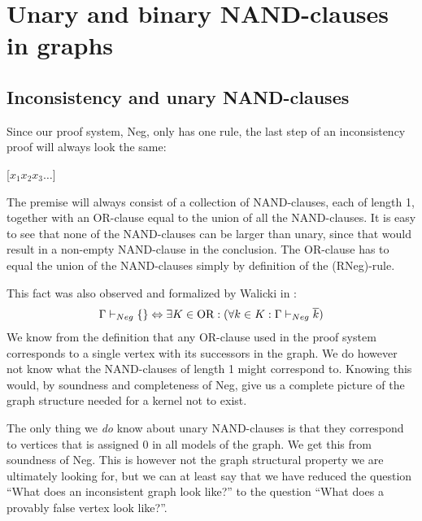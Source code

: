 \section{Unary and binary NAND-clauses in graphs}
\label{sec:Unary and binary NAND-clauses in graphs}
\subsection{Inconsistency and unary NAND-clauses}
\label{sub:Inconsistency and unary NAND-clauses}
Since our proof system, Neg, only has one rule, the last step of an inconsistency proof will always look the same:
\begin{prooftree*}
  \Hypo{\dots}
  [$x_1x_2x_3\dots$]{\varnothing}
\end{prooftree*}
The premise will always consist of a collection of NAND-clauses, each of length 1, together with an OR-clause equal to the union of all the NAND-clauses.
It is easy to see that none of the NAND-clauses can be larger than unary, since that would result in a non-empty NAND-clause in the conclusion.
The OR-clause has to equal the union of the NAND-clauses simply by definition of the (RNeg)-rule.

This fact was also observed and formalized by Walicki in \cite{michal-completeness}:
\begin{align}
  \Gamma \vdash_{Neg} \{\} \Leftrightarrow \exists K \in \text{OR}: (\forall  k \in K: \Gamma \vdash_{Neg} \overline{k})
\end{align}
We know from the definition that any OR-clause used in the proof system corresponds to a single vertex with its successors in the graph.
We do however not know what the NAND-clauses of length 1 might correspond to.
Knowing this would, by soundness and completeness of Neg, give us a complete picture of the graph structure needed for a kernel not to exist.

The only thing we \textit{do} know about unary NAND-clauses is that they correspond to vertices that is assigned 0 in all models of the graph.
We get this from soundness of Neg.
This is however not the graph structural property we are ultimately looking for, but we can at least say that we have reduced the question ``What does an inconsistent graph look like?'' to the question ``What does a provably false vertex look like?''.

